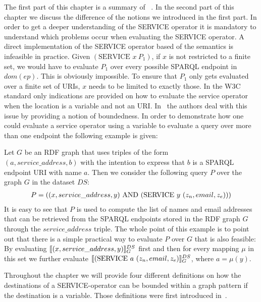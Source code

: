The first part of this chapter is a summary of ~\cite[p. 4-7]{BuilAranda20131}. 
In the second part of this chapter we discuss the difference of the notions we
introduced in the first part.
In order to get a
deeper understanding of the SERVICE operator it is mandatory to understand which
problems occur when evaluating the SERVICE operator.
A direct implementation of the SERVICE operator based of the semantics is
infeasible in practice. Given $(\mbox{SERVICE }  x \
P_1)$, if $x$ is not restricted to a finite set, we would have to evaluate $P_1$ over every 
possible SPARQL endpoint in $dom(ep)$. This is obviously impossible. To ensure that $P_1$
only gets evaluated over a finite set of URIs, $x$ needs to be limited to exactly
those. In the W3C standard only indications are provided on how to evaluate the
service operator~\cite{w3standardservice} when the location is a variable and
not an URI. In~\cite{BuilAranda20131} the authors deal with this issue by
providing a notion of boundedness. In order to demonstrate how one could
evaluate a service operator using a variable to evaluate a query over more than
one endpoint the following example is given:
\begin{example}
	Let $G$ be an RDF graph that uses triples of the form\\ $(a, service\_address,b)$
	with the intention to express that $b$ is a SPARQL endpoint URI with name $a$.
	Then we consider the following query $P$ over the graph $G$ in the dataset $DS$:
	\begin{align*}
		P=((x, service\_address, y) \AND (\mbox{SERVICE } y \ (z_n,email,z_e)))
	\end{align*}
	It is easy to see that $P$ is used to compute the list of names and email
	addresses that can be retrieved from the SPARQL endpoints stored in the RDF
	graph $G$ through the $service\_address$ triple. 
	The whole point of this example is to point out that there is a simple practical
	way to evaluate $P$ over $G$ that is also feasible:
	By evaluating $\llbracket (x,service\_address,y) \rrbracket^{DS}_G$ first and then for every
	mapping $\mu$ in this set we further evaluate $\llbracket (\mbox{SERVICE } a \ (z_n, email, z_e)
	\rrbracket^{DS}_G$, where $a = \mu(y)$. 
\end{example}
Throughout the chapter we will provide four different definitions on how the
destinations of a SERVICE-operator can be bounded within a graph pattern if the
destination is a variable. Those definitions were first introduced
in~\cite{BuilAranda20131}.
